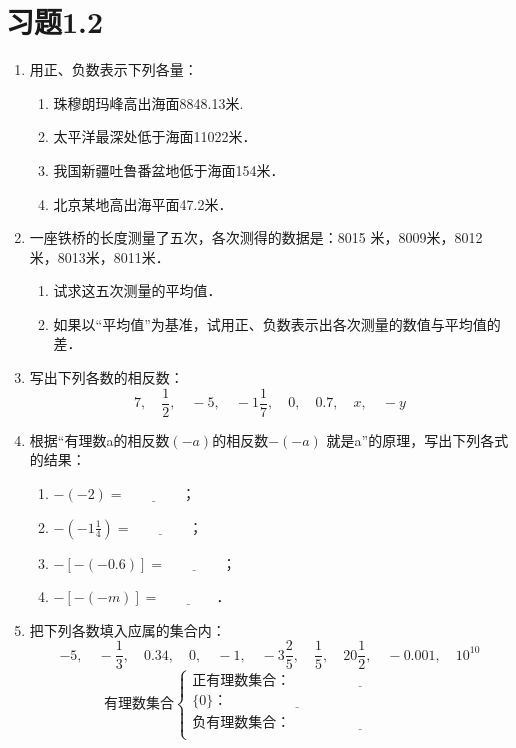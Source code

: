 \section*{习题1.2}
\begin{enumerate}
	\item 用正、负数表示下列各量：
	\begin{enumerate}
		\item 珠穆朗玛峰高出海面8848.13米.
		\item 太平洋最深处低于海面11022米．
		\item 我国新疆吐鲁番盆地低于海面154米．
		\item 北京某地高出海平面47.2米．
	\end{enumerate}
	\item 一座铁桥的长度测量了五次，各次测得的数据是：8015
	米，8009米，8012米，8013米，8011米．
	\begin{enumerate}
		\item 试求这五次测量的平均值．
		\item 如果以“平均值”为基准，试用正、负数表示出各次测量的数值与平均值的差．
	\end{enumerate}
	\item 写出下列各数的相反数：
	\[7,\quad \frac{1}{2},\quad -5,\quad -1\frac{1}{7},\quad 0,\quad 0.7,\quad x,\quad -y  \]
	\item 根据“有理数a的相反数$(- a)$的相反数$-(-a)$
	就是a”的原理，写出下列各式的结果：
	\begin{enumerate}
		\item $-(-2)=\underline{\qquad\qquad}$；
		\item $-\left(-1\frac{1}{4}\right)=\underline{\qquad\qquad}$；
		\item $-[-(-0.6)]=\underline{\qquad\qquad}$；
		\item $-[-(-m)]=\underline{\qquad\qquad}$．
	\end{enumerate}
	\item 把下列各数填入应属的集合内：
	\[-5,\quad -\frac{1}{3},\quad 0.34,\quad 0,\quad -1,\quad -3\frac{2}{5},\quad \frac{1}{5},\quad 20\frac{1}{2},\quad -0.001,\quad 10^{10} \]
	\[\text{有理数集合}\begin{cases}
	\text{正有理数集合：}\underline{\qquad\qquad\qquad\qquad\qquad}\\
	\{0\}： \underline{\qquad\qquad\qquad\qquad\qquad}\\    
	\text{负有理数集合：}\underline{\qquad\qquad\qquad\qquad\qquad}\\
	\end{cases}\]
	

\end{enumerate}
